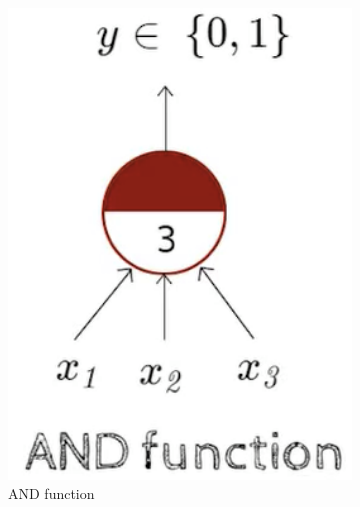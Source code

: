 \documentclass[a4paper]{article}
\begin{document}
\begin{itemize}
\begin{figure}[H]
\begin{subfigure}[b]{0.225\textwidth}
            \includegraphics[width=1\textwidth]{Degree//static/DL_Pitts_AND.png}
            \caption{AND function}
            \label{fig:DL-pitts-AND}
        \end{subfigure}
        \hfill
        \begin{subfigure}[b]{0.225\textwidth}
            \centering

\end{subfigure}
\end{figure}
\end{itemize}
\end{document}

